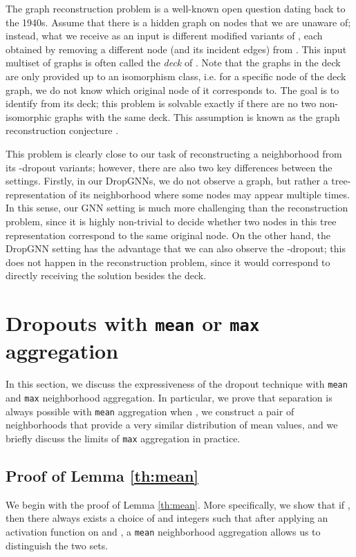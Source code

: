 \documentclass{article}
\begin{document}
The graph reconstruction problem is a well-known open question dating back to the 1940s. Assume that there is a hidden graph  on  nodes that we are unaware of; instead, what we receive as an input is  different modified variants of , each obtained by removing a different node (and its incident edges) from . This input multiset of graphs is often called the \textit{deck} of . Note that the graphs in the deck are only provided up to an isomorphism class, i.e. for a specific node of the deck graph, we do not know which original node of  it corresponds to. The goal is to identify  from its deck; this problem is solvable exactly if there are no two non-isomorphic graphs with the same deck. This assumption is known as the graph reconstruction conjecture \citep{reconstruction}.

This problem is clearly close to our task of reconstructing a neighborhood from its -dropout variants; however, there are also two key differences between the settings. Firstly, in our DropGNNs, we do not observe a graph, but rather a tree-representation of its neighborhood where some nodes may appear multiple times. In this sense, our GNN setting is much more challenging than the reconstruction problem, since it is highly non-trivial to decide whether two nodes in this tree representation correspond to the same original node. On the other hand, the DropGNN setting has the advantage that we can also observe the -dropout; this does not happen in the reconstruction problem, since it would correspond to directly receiving the solution besides the deck.

\section{Dropouts with \texttt{mean} or \texttt{max} aggregation} \label{app:aggregate}

In this section, we discuss the expressiveness of the dropout technique with \texttt{mean} and \texttt{max} neighborhood aggregation. In particular, we prove that separation is always possible with \texttt{mean} aggregation when , we construct a pair of neighborhoods that provide a very similar distribution of mean values, and we briefly discuss the limits of \texttt{max} aggregation in practice.

\subsection{Proof of Lemma \ref{th:mean}}

We begin with the proof of Lemma \ref{th:mean}. More specifically, we show that if , then there always exists a choice of  and integers  such that after applying an activation function  on  and , a \texttt{mean} neighborhood aggregation allows us to distinguish the two sets.
\end{document}
